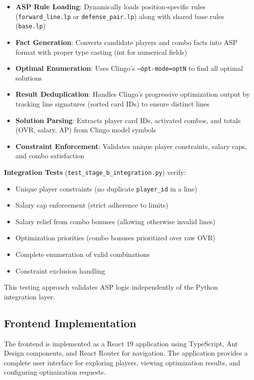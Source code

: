 \begin{itemize}
    \item \textbf{ASP Rule Loading}: Dynamically loads position-specific rules (\texttt{forward\_line.lp} or \texttt{defense\_pair.lp}) along with shared base rules (\texttt{base.lp})
    \item \textbf{Fact Generation}: Converts candidate players and combo facts into ASP format with proper type casting (int for numerical fields)
    \item \textbf{Optimal Enumeration}: Uses Clingo's \texttt{--opt-mode=optN} to find all optimal solutions
    \item \textbf{Result Deduplication}: Handles Clingo's progressive optimization output by tracking line signatures (sorted card IDs) to ensure distinct lines
    \item \textbf{Solution Parsing}: Extracts player card IDs, activated combos, and totals (OVR, salary, AP) from Clingo model symbols
    \item \textbf{Constraint Enforcement}: Validates unique player constraints, salary caps, and combo satisfaction
\end{itemize}

\textbf{Integration Tests} (\texttt{test\_stage\_b\_integration.py}) verify:
\begin{itemize}
    \item Unique player constraints (no duplicate \texttt{player\_id} in a line)
    \item Salary cap enforcement (strict adherence to limits)
    \item Salary relief from combo bonuses (allowing otherwise invalid lines)
    \item Optimization priorities (combo bonuses prioritized over raw OVR)
    \item Complete enumeration of valid combinations
    \item Constraint exclusion handling
\end{itemize}

This testing approach validates ASP logic independently of the Python integration layer.

\subsection{Frontend Implementation}

The frontend is implemented as a React 19 application using TypeScript, Ant Design components, and React Router for navigation. The application provides a complete user interface for exploring players, viewing optimization results, and configuring optimization requests.

